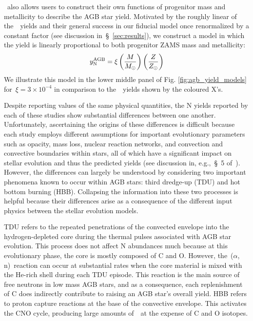 \documentclass[ms.tex]{subfiles}
\begin{document}
\vice~also allows users to construct their own functions of progenitor mass
and metallicity to describe the AGB star yield.
Motivated by the roughly linear of the~\cristallo~yields and their general
success in our fiducial model once renormalized by a constant factor (see
discussion in~\S~\ref{sec:results}), we construct a model in which the yield
is linearly proportional to both progenitor ZAMS mass and metallicity:
\begin{equation}
y_\text{N}^\text{AGB} = \xi \left(\frac{M}{M_\odot}\right) \left(\frac{Z}{Z_\odot}\right)
\end{equation}
We illustrate this model in the lower middle panel of Fig.
\ref{fig:agb_yield_models} for~$\xi = 3\times10^{-4}$ in comparison to
the~\cristallo~yields shown by the coloured X's.
\par
Despite reporting values of the same physical quantities, the N yields
reported by each of these studies show substantial differences between one
another.
Unfortunately, ascertaining the origins of these differences is difficult
because each study employs different assumptions for important evolutionary
parameters such as opacity, mass loss, nuclear reaction networks, and
convection and convective boundaries within stars, all of which have a
significant impact on stellar evolution and thus the predicted yields (see
discussion in, e.g.,~\S~5 of~\citealp{Karakas2016}).
However, the differences can largely be understood by considering two important
phenomena known to occur within AGB stars: third dredge-up (TDU) and hot bottom
burning (HBB).
Collapsing the information into these two processes is helpful because their
differences arise as a consequence of the different input physics between the
stellar evolution models.
\par
TDU refers to the repeated penetrations of the convected envelope into the
hydrogen-depleted core during the thermal pulses associated with AGB star
evolution.
This process does not affect N abundances much because at this evolutionary
phase, the core is mostly composed of C and O.
However, the~\Cthirteen($\alpha$, n)\Osixteen~reaction can occur at substantial
rates when the core material is mixed with the He-rich shell during each TDU
episode.
This reaction is the main source of free neutrons in low mass AGB stars, and as
a consequence, each replenishment of C does indirectly contribute to raising
an AGB star's overall yield.
HBB refers to proton capture reactions at the base of the convective envelope.
This activates the CNO cycle, producing large amounts of~\Nfourteen~at the
expense of C and O isotopes.
\end{document}
